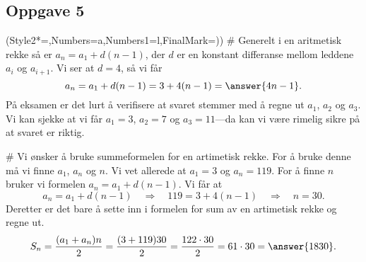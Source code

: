 \subsection*{Oppgave 5}
\begin{easylist}[enumerate]
\ListProperties(Style2*=,Numbers=a,Numbers1=l,FinalMark={)})
# Generelt i en aritmetisk rekke så er $a_n = a_1 + d(n-1)$,
der $d$ er en konstant differanse mellom leddene $a_i$ og $a_{i+1}$.
Vi ser at $d = 4$, så vi får
\begin{equation*}
	a_n = a_1 + d(n-1) =  3 + 4(n-1) = \answer{4n - 1}.
\end{equation*}
På eksamen er det lurt å verifisere at svaret stemmer med å regne ut $a_1$, $a_2$ og $a_3$. 
Vi kan sjekke at vi får $a_1 = 3$, $a_2 = 7$ og $a_3 = 11$---da kan vi være rimelig sikre på at svaret er riktig.

# Vi ønsker å bruke summeformelen for en artimetisk rekke.
For å bruke denne må vi finne $a_1$, $a_n$ og $n$.
Vi vet allerede at $a_1 = 3$ og $a_n = 119$.
For å finne $n$ bruker vi formelen $a_n = a_1 + d(n-1)$.
Vi får at
\begin{equation*}
	a_n = a_1 + d(n-1) \quad \Rightarrow  \quad
	119 = 3 + 4(n-1) \quad \Rightarrow \quad n = 30.
\end{equation*}
Deretter er det bare å sette inn i formelen for sum av en artimetisk rekke og regne ut.
\begin{equation*}
	S_n = \frac{(a_1 + a_n) n}{2} = \frac{(3 + 119) 30}{2} = \frac{122 \cdot 30}{2} = 61 \cdot 30 = \answer{1830}.
\end{equation*}
\end{easylist}


